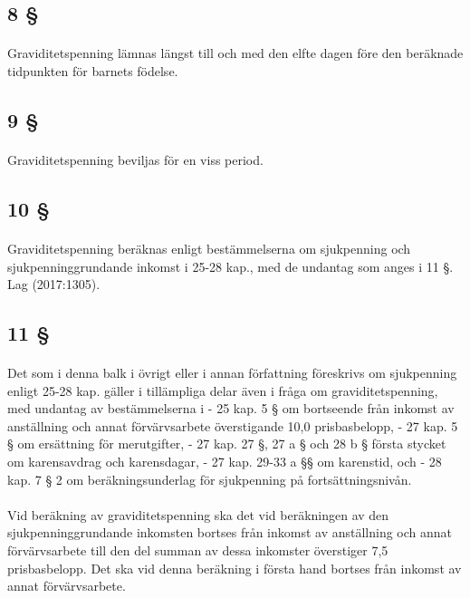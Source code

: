 \documentclass[a4paper,notitlepage,openany,10pt]{book}
\begin{document}
\subsection*{8 §}
\paragraph*{}
Graviditetspenning lämnas längst till och med den elfte dagen före den beräknade tidpunkten för barnets födelse.
\subsection*{9 §}
\paragraph*{}
Graviditetspenning beviljas för en viss period.
\subsection*{10 §}
\paragraph*{}
Graviditetspenning beräknas enligt bestämmelserna om sjukpenning och sjukpenninggrundande inkomst i 25-28 kap., med de undantag som anges i 11 §.
Lag (2017:1305).
\subsection*{11 §}
\paragraph*{}
Det som i denna balk i övrigt eller i annan författning föreskrivs om sjukpenning enligt 25-28 kap. gäller i tillämpliga delar även i fråga om graviditetspenning, med undantag av bestämmelserna i
\newline - 25 kap. 5 § om bortseende från inkomst av anställning och annat förvärvsarbete överstigande 10,0 prisbasbelopp,
\newline - 27 kap. 5 § om ersättning för merutgifter,
\newline - 27 kap. 27 §, 27 a § och 28 b § första stycket om karensavdrag och karensdagar,
\newline - 27 kap. 29-33 a §§ om karenstid, och
\newline - 28 kap. 7 § 2 om beräkningsunderlag för sjukpenning på fortsättningsnivån.
\paragraph*{}
Vid beräkning av graviditetspenning ska det vid beräkningen av den sjukpenninggrundande inkomsten bortses från inkomst av anställning och annat förvärvsarbete till den del summan av dessa inkomster överstiger 7,5 prisbasbelopp. Det ska vid denna beräkning i första hand bortses från inkomst av annat förvärvsarbete.
\end{document}
